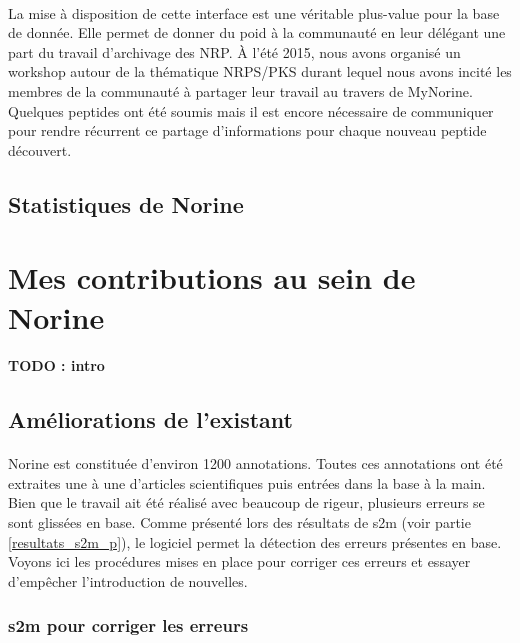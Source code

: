 \documentclass[12pt,french,twoside]{report}
\begin{document}
\paragraph{}La mise à disposition de cette interface est une véritable plus-value pour la base de donnée.
Elle permet de donner du poid à la communauté en leur délégant une part du travail d'archivage des NRP.
À l'été 2015, nous avons organisé un workshop autour de la thématique NRPS/PKS durant lequel nous avons incité les membres de la communauté à partager leur travail au travers de MyNorine.
Quelques peptides ont été soumis mais il est encore nécessaire de communiquer pour rendre récurrent ce partage d'informations pour chaque nouveau peptide découvert.


\subsection{Statistiques de Norine}








\section{Mes contributions au sein de Norine}

\paragraph{TODO : intro}


\subsection{Améliorations de l'existant}

\paragraph{}Norine est constituée d'environ 1200 annotations.
Toutes ces annotations ont été extraites une à une d'articles scientifiques puis entrées dans la base à la main.
Bien que le travail ait été réalisé avec beaucoup de rigeur, plusieurs erreurs se sont glissées en base.
Comme présenté lors des résultats de s2m (voir partie \ref{resultats_s2m_p}), le logiciel permet la détection des erreurs présentes en base.
Voyons ici les procédures mises en place pour corriger ces erreurs et essayer d'empêcher l'introduction de nouvelles.


\subsubsection{s2m pour corriger les erreurs}
\end{document}
